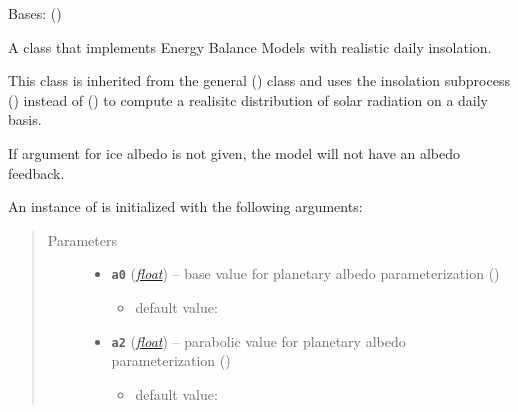 \documentclass[a4paper,10pt,english]{sphinxmanual}
\begin{document}
\begin{fulllineitems}
\label{api/climlab.model:climlab.model.ebm.EBM_seasonal}
Bases: {\hyperref[api/climlab.model:climlab.model.ebm.EBM]{\emph{}}} ()

A class that implements Energy Balance Models with realistic 
daily insolation.

This class is inherited from the general {\hyperref[api/climlab.model:climlab.model.ebm.EBM]{\emph{}}} ()
class and uses the insolation subprocess 
{\hyperref[api/climlab.radiation:climlab.radiation.insolation.DailyInsolation]{\emph{}}} () instead of 
{\hyperref[api/climlab.radiation:climlab.radiation.insolation.P2Insolation]{\emph{}}} () to compute a
realisitc distribution of solar radiation on a daily basis.

If argument for ice albedo  is not given, the model will not 
have an albedo feedback.

An instance of  is initialized with the following 
arguments:
\begin{quote}\begin{description}
\item[{Parameters}] \leavevmode\begin{itemize}
\item {} 
\textbf{\texttt{a0}} (\href{http://docs.python.org/2.7/library/functions.html\#float}{\emph{float}}) -- 
base value for planetary albedo parameterization
{\hyperref[api/climlab.surface:climlab.surface.albedo.StepFunctionAlbedo]{\emph{}}} ()
\begin{itemize}
\item {} 
default value: 

\end{itemize}


\item {} 
\textbf{\texttt{a2}} (\href{http://docs.python.org/2.7/library/functions.html\#float}{\emph{float}}) -- 
parabolic value for planetary  albedo parameterization
{\hyperref[api/climlab.surface:climlab.surface.albedo.StepFunctionAlbedo]{\emph{}}} ()
\begin{itemize}
\item {} 
default value: 


\end{itemize}
\end{itemize}
\end{description}
\end{quote}
\end{fulllineitems}
\end{document}
